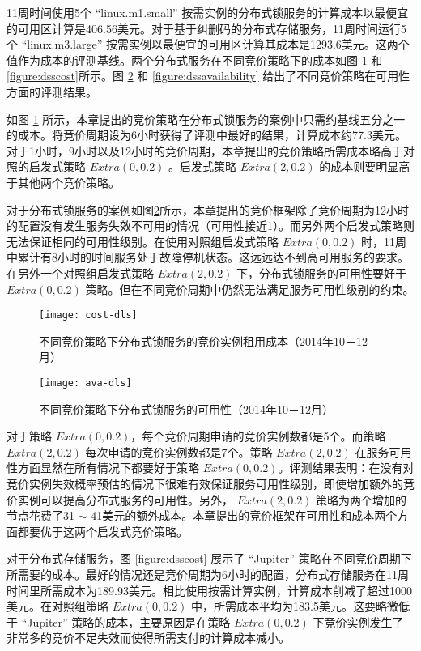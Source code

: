 11周时间使用5个 ``linux.m1.small'' 按需实例的分布式锁服务的计算成本以最便宜的可用区计算是406.56美元。对于基于纠删码的分布式存储服务，11周时间运行5个 ``linux.m3.large'' 按需实例以最便宜的可用区计算其成本是1293.6美元。这两个值作为成本的评测基线。两个分布式服务在不同竞价策略下的成本如图 \ref{figure:dlscost} 和 \ref{figure:dsscost}所示。图 \ref{figure:dlsavailability} 和 \ref{figure:dssavailability} 给出了不同竞价策略在可用性方面的评测结果。

如图 \ref{figure:dlscost} 所示，本章提出的竞价策略在分布式锁服务的案例中只需约基线五分之一的成本。将竞价周期设为6小时获得了评测中最好的结果，计算成本约77.3美元。对于1小时，9小时以及12小时的竞价周期，本章提出的竞价策略所需成本略高于对照的启发式策略 $Extra(0, 0.2)$ 。启发式策略 $Extra(2, 0.2)$ 的成本则要明显高于其他两个竞价策略。

对于分布式锁服务的案例如图\ref{figure:dlsavailability}所示，本章提出的竞价框架除了竞价周期为12小时的配置没有发生服务失效不可用的情况（可用性接近1）。而另外两个启发式策略则无法保证相同的可用性级别。在使用对照组启发式策略 $Extra(0, 0.2)$ 时，11周中累计有8小时的时间服务处于故障停机状态。这远远达不到高可用服务的要求。在另外一个对照组启发式策略 $Extra(2, 0.2)$ 下，分布式锁服务的可用性要好于 $Extra(0, 0.2)$ 策略。但在不同竞价周期中仍然无法满足服务可用性级别的约束。
\begin{figure}
  \centering
  \texttt{[image: cost-dls]}
  \caption{不同竞价策略下分布式锁服务的竞价实例租用成本（2014年10－12月）}
  \label{figure:dlscost}
\end{figure}
\begin{figure}
  \centering
  \texttt{[image: ava-dls]}
  \caption{不同竞价策略下分布式锁服务的可用性（2014年10－12月）}
  \label{figure:dlsavailability}
\end{figure}

对于策略 $Extra(0, 0.2)$，每个竞价周期申请的竞价实例数都是5个。而策略 $Extra(2, 0.2)$ 每次申请的竞价实例数都是7个。策略 $Extra(2, 0.2)$ 在服务可用性方面显然在所有情况下都要好于策略 $Extra(0, 0.2)$。评测结果表明：在没有对竞价实例失效概率预估的情况下很难有效保证服务可用性级别，即使增加额外的竞价实例可以提高分布式服务的可用性。另外， $Extra(2, 0.2)$ 策略为两个增加的节点花费了31 $\sim$ 41美元的额外成本。本章提出的竞价框架在可用性和成本两个方面都要优于这两个启发式竞价策略。

对于分布式存储服务，图 \ref{figure:dsscost} 展示了 ``Jupiter'' 策略在不同竞价周期下所需要的成本。最好的情况还是竞价周期为6小时的配置，分布式存储服务在11周时间里所需成本为189.93美元。相比使用按需计算实例，计算成本削减了超过1000美元。在对照组策略 $Extra(0, 0.2)$ 中，所需成本平均为183.5美元。这要略微低于 ``Jupiter'' 策略的成本，主要原因是在策略 $Extra(0, 0.2)$ 下竞价实例发生了非常多的竞价不足失效而使得所需支付的计算成本减小。


